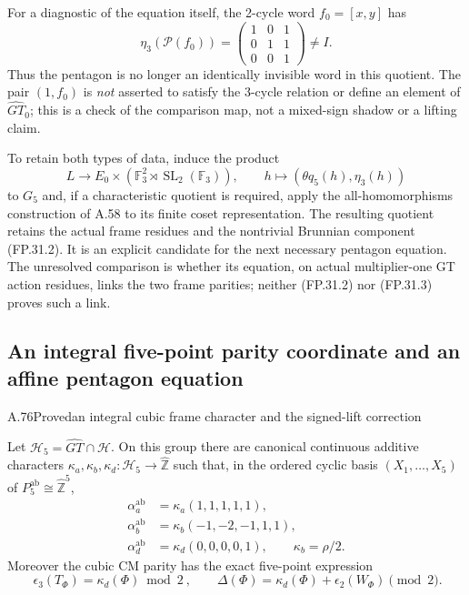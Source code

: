 For a diagnostic of the equation itself, the 2-cycle word
$f_0=[x,y]$ has
\[
 \eta_3(\mathcal P(f_0))=
 \begin{pmatrix}1&0&1\\0&1&1\\0&0&1\end{pmatrix}\ne I.
 \tag{FP.31.3}
\]
Thus the pentagon is no longer an identically invisible word in this
quotient. The pair $(1,f_0)$ is \emph{not} asserted to satisfy the
3-cycle relation or define an element of $\widehat{GT}_0$; this is
a check of the comparison map, not a mixed-sign shadow or a lifting
claim.

To retain both types of data, induce the product
\[
 L\longrightarrow E_0\times
          (\mathbb F_3^2\rtimes\operatorname{SL}_2(\mathbb F_3)),
 \qquad h\longmapsto(\theta q_5(h),\eta_3(h))
\]
to $G_5$ and, if a characteristic quotient is required, apply the
all-homomorphisms construction of A.58 to its finite coset
representation. The resulting quotient retains the actual frame
residues and the nontrivial Brunnian component (FP.31.2).
It is an explicit candidate for the next necessary pentagon equation.
The unresolved comparison is whether its equation, on actual
multiplier-one GT action residues, links the two frame parities;
neither (FP.31.2) nor (FP.31.3) proves such a link.

\subsection{An integral five-point parity coordinate and an affine pentagon equation}


\begin{statement}{A.76}{Proved}{an integral cubic frame character and the signed-lift correction}
\end{statement}
Let $\mathcal H_5=\widehat{GT}\cap\mathcal H$. On this group there
are canonical continuous additive characters
$\kappa_a,\kappa_b,\kappa_d:\mathcal H_5\to\widehat{\mathbb Z}$
such that, in the ordered cyclic basis $(X_1,\ldots,X_5)$ of
$P_5^{\mathrm{ab}}\cong\widehat{\mathbb Z}^{5}$,
\[
 \begin{split}
 \alpha_a^{\mathrm{ab}}&=\kappa_a(1,1,1,1,1),\\
 \alpha_b^{\mathrm{ab}}&=\kappa_b(-1,-2,-1,1,1),\\
 \alpha_d^{\mathrm{ab}}&=\kappa_d(0,0,0,0,1),\qquad
 \kappa_b=\rho/2.
 \end{split}
 \tag{FP.32.1}
\]
Moreover the cubic CM parity has the exact five-point expression
\[
 \boxed{\ \epsilon_3(T_\Phi)=\kappa_d(\Phi)\bmod2\ },
 \qquad
 \Delta(\Phi)=\kappa_d(\Phi)+\epsilon_2(W_\Phi)\pmod2.
 \tag{FP.32.2}
\]

